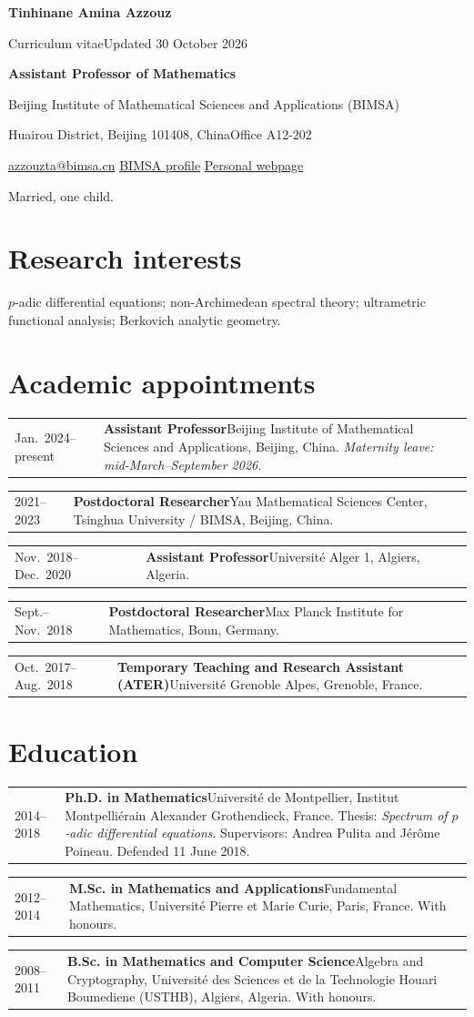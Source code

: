\documentclass[11pt,a4paper]{article}
\makeatletter
\newcommand{\entry}[3]{%
  \begin{tabularx}{\textwidth}{@{}>{\raggedright\arraybackslash}p{32mm}@{\hspace{4mm}}>{\raggedright\arraybackslash}X@{}}%
  \textcolor{muted}{#1} & \textbf{#2}\newline #3
  \end{tabularx}\par\vspace{3pt}}
\makeatother
\begin{document}
{\fontsize{26}{29}\selectfont\bfseries\color{accent}Tinhinane Amina Azzouz}\par
\vspace{3pt}
{\large Curriculum vitae}\hfill{\small\color{muted}Updated 30 October 2026}\par
\vspace{7pt}
\textbf{Assistant Professor of Mathematics}\par
Beijing Institute of Mathematical Sciences and Applications (BIMSA)\par
Huairou District, Beijing 101408, China\quad\textperiodcentered\quad Office A12-202\par
\href{mailto:azzouzta@bimsa.cn}{azzouzta@bimsa.cn}\quad\textperiodcentered\quad
\href{https://www.bimsa.cn/detail/tinhinaneazzouz.html}{BIMSA profile}\quad\textperiodcentered\quad
\href{https://tinaamina.github.io/}{Personal webpage}\par
{\small\color{muted}Married, one child.}\par

\section{Research interests}
$p$-adic differential equations; non-Archimedean spectral theory; ultrametric functional analysis; Berkovich analytic geometry.

\section{Academic appointments}
\entry{Jan.\ 2024--present}{Assistant Professor}{Beijing Institute of Mathematical Sciences and Applications, Beijing, China.\newline
\emph{Maternity leave: mid-March--September 2026.}}
\entry{2021--2023}{Postdoctoral Researcher}{Yau Mathematical Sciences Center, Tsinghua University / BIMSA, Beijing, China.}
\entry{Nov.\ 2018--Dec.\ 2020}{Assistant Professor}{Universit\'e Alger 1, Algiers, Algeria.}
\entry{Sept.--Nov.\ 2018}{Postdoctoral Researcher}{Max Planck Institute for Mathematics, Bonn, Germany.}
\entry{Oct.\ 2017--Aug.\ 2018}{Temporary Teaching and Research Assistant (ATER)}{Universit\'e Grenoble Alpes, Grenoble, France.}

\section{Education}
\entry{2014--2018}{Ph.D. in Mathematics}{Universit\'e de Montpellier, Institut Montpelli\'erain Alexander Grothendieck, France.\newline
Thesis: \emph{Spectrum of $p$-adic differential equations}.\newline
Supervisors: Andrea Pulita and J\'er\^ome Poineau. Defended 11 June 2018.}
\entry{2012--2014}{M.Sc. in Mathematics and Applications}{Fundamental Mathematics, Universit\'e Pierre et Marie Curie, Paris, France. With honours.}
\entry{2008--2011}{B.Sc. in Mathematics and Computer Science}{Algebra and Cryptography, Universit\'e des Sciences et de la Technologie Houari Boumediene (USTHB), Algiers, Algeria. With honours.}
\end{document}
